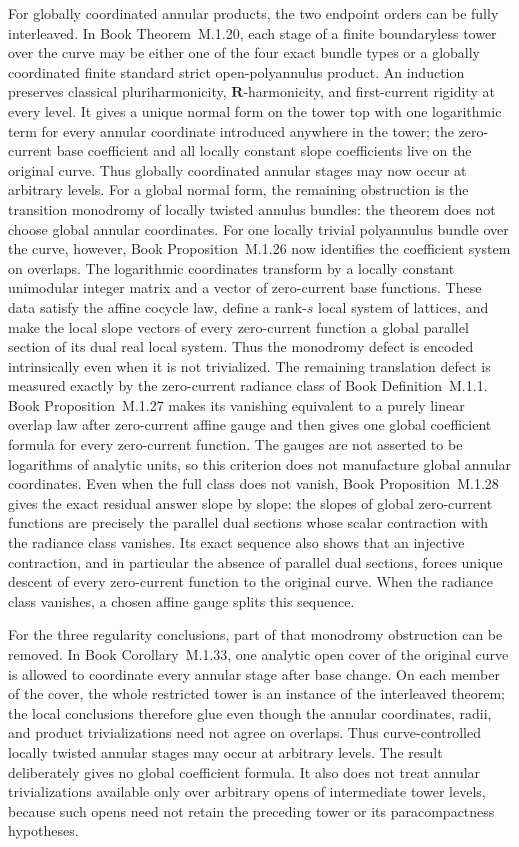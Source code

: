 \documentclass[11pt,a4paper]{article}
\theoremstyle{definition}
\theoremstyle{remark}
\begin{document}
For globally coordinated annular products, the two endpoint orders can be
fully interleaved.  In
Book Theorem~M.1.20, each stage of a
finite boundaryless tower over the curve may be either one of the four exact
bundle types or a globally coordinated finite standard strict
open-polyannulus product.  An induction preserves classical
pluriharmonicity, \(\mathbf R\)-harmonicity, and first-current rigidity at
every level.  It gives a unique normal form on the tower top with one
logarithmic term for every annular coordinate introduced anywhere in the
tower; the zero-current base coefficient and all locally constant slope
coefficients live on the original curve.  Thus globally coordinated annular
stages may now occur at arbitrary levels.  For a global normal form, the
remaining obstruction is the transition monodromy of locally twisted annulus
bundles: the theorem does not choose global annular coordinates.  For one
locally trivial polyannulus bundle over the curve, however,
Book Proposition~M.1.26 now identifies the
coefficient system on overlaps.  The logarithmic coordinates transform by a
locally constant unimodular integer matrix and a vector of zero-current base
functions.  These data satisfy the affine cocycle law, define a rank-\(s\)
local system of lattices, and make the local slope vectors of every
zero-current function a global parallel section of its dual real local
system.  Thus the monodromy defect is encoded intrinsically even when it is
not trivialized.  The remaining translation defect is measured exactly by
the zero-current radiance class of
Book Definition~M.1.1.
Book Proposition~M.1.27 makes its vanishing
equivalent to a purely linear overlap law after zero-current affine gauge
and then gives one global coefficient formula for every zero-current
function.  The gauges are not asserted to be logarithms of analytic units,
so this criterion does not manufacture global annular coordinates.
Even when the full class does not vanish,
Book Proposition~M.1.28 gives the exact residual
answer slope by slope: the slopes of global zero-current functions are
precisely the parallel dual sections whose scalar contraction with the
radiance class vanishes.  Its exact sequence also shows that an injective
contraction, and in particular the absence of parallel dual sections,
forces unique descent of every zero-current function to the original curve.
When the radiance class vanishes, a chosen affine gauge splits this sequence.

For the three regularity conclusions, part of that monodromy obstruction can
be removed.  In
Book Corollary~M.1.33, one analytic open
cover of the original curve is allowed to coordinate every annular stage
after base change.  On each member of the cover, the whole restricted tower
is an instance of the interleaved theorem; the local conclusions therefore
glue even though the annular coordinates, radii, and product trivializations
need not agree on overlaps.  Thus curve-controlled locally twisted annular
stages may occur at arbitrary levels.  The result deliberately gives no
global coefficient formula.  It also does not treat annular trivializations
available only over arbitrary opens of intermediate tower levels, because
such opens need not retain the preceding tower or its paracompactness
hypotheses.
\end{document}
